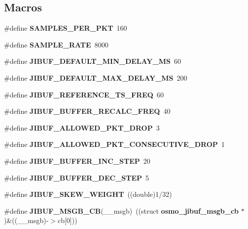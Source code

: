 \subsection*{Macros}
\begin{DoxyCompactItemize}
\item 
\#define {\bfseries S\+A\+M\+P\+L\+E\+S\+\_\+\+P\+E\+R\+\_\+\+P\+KT}~160
\item 
\#define {\bfseries S\+A\+M\+P\+L\+E\+\_\+\+R\+A\+TE}~8000
\item 
\#define {\bfseries J\+I\+B\+U\+F\+\_\+\+D\+E\+F\+A\+U\+L\+T\+\_\+\+M\+I\+N\+\_\+\+D\+E\+L\+A\+Y\+\_\+\+MS}~60
\item 
\#define {\bfseries J\+I\+B\+U\+F\+\_\+\+D\+E\+F\+A\+U\+L\+T\+\_\+\+M\+A\+X\+\_\+\+D\+E\+L\+A\+Y\+\_\+\+MS}~200
\item 
\#define {\bfseries J\+I\+B\+U\+F\+\_\+\+R\+E\+F\+E\+R\+E\+N\+C\+E\+\_\+\+T\+S\+\_\+\+F\+R\+EQ}~60
\item 
\#define {\bfseries J\+I\+B\+U\+F\+\_\+\+B\+U\+F\+F\+E\+R\+\_\+\+R\+E\+C\+A\+L\+C\+\_\+\+F\+R\+EQ}~40
\item 
\#define {\bfseries J\+I\+B\+U\+F\+\_\+\+A\+L\+L\+O\+W\+E\+D\+\_\+\+P\+K\+T\+\_\+\+D\+R\+OP}~3
\item 
\#define {\bfseries J\+I\+B\+U\+F\+\_\+\+A\+L\+L\+O\+W\+E\+D\+\_\+\+P\+K\+T\+\_\+\+C\+O\+N\+S\+E\+C\+U\+T\+I\+V\+E\+\_\+\+D\+R\+OP}~1
\item 
\#define {\bfseries J\+I\+B\+U\+F\+\_\+\+B\+U\+F\+F\+E\+R\+\_\+\+I\+N\+C\+\_\+\+S\+T\+EP}~20
\item 
\#define {\bfseries J\+I\+B\+U\+F\+\_\+\+B\+U\+F\+F\+E\+R\+\_\+\+D\+E\+C\+\_\+\+S\+T\+EP}~5
\item 
\#define {\bfseries J\+I\+B\+U\+F\+\_\+\+S\+K\+E\+W\+\_\+\+W\+E\+I\+G\+HT}~((double)1/32)
\item 
\#define {\bfseries J\+I\+B\+U\+F\+\_\+\+M\+S\+G\+B\+\_\+\+CB}(\+\_\+\+\_\+msgb)~((struct {\bf osmo\+\_\+jibuf\+\_\+msgb\+\_\+cb} $\ast$)\&((\+\_\+\+\_\+msgb)-\/$>$cb[0]))
\end{DoxyCompactItemize}
